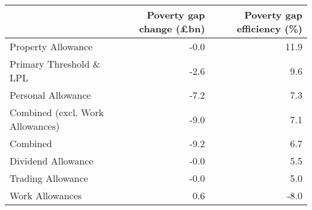 \begin{tabular}{lrr}
\toprule
{} &  Poverty gap change (£bn) &  Poverty gap efficiency (\%) \\
\midrule
Property Allowance               &                      -0.0 &                        11.9 \\
Primary Threshold \& LPL          &                      -2.6 &                         9.6 \\
Personal Allowance               &                      -7.2 &                         7.3 \\
Combined (excl. Work Allowances) &                      -9.0 &                         7.1 \\
Combined                         &                      -9.2 &                         6.7 \\
Dividend Allowance               &                      -0.0 &                         5.5 \\
Trading Allowance                &                      -0.0 &                         5.0 \\
Work Allowances                  &                       0.6 &                        -8.0 \\
\bottomrule
\end{tabular}
